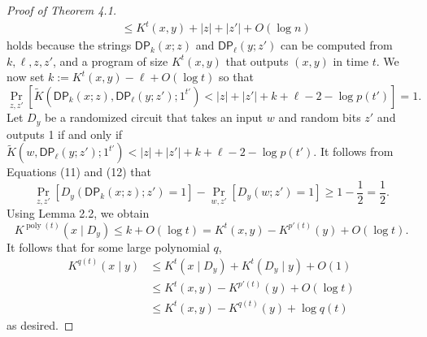 \documentclass[10pt,a4paper]{article}
\begin{document}
\begin{proof}[Proof of Theorem 4.1]
\begin{align*}
&\leq K^t(x,y)+|z|+|z'|+O(\log n)
\end{align*}
holds because the strings $\mathsf{DP}_k(x;z)$ and $\mathsf{DP}_\ell(y;z')$ can be computed from $k,\ell,z,z'$, and a program of size $K^t(x,y)$ that outputs $(x,y)$ in time $t$. We now set $k:=K^t(x,y)-\ell+O(\log t)$ so that
\[\Pr_{z,z'}[\widetilde K(\mathsf{DP}_k(x;z),\mathsf{DP}_\ell(y;z');1^{t'})<|z|+|z'|+k+\ell-2-\log p(t')]=1.\tag{12}\]
Let $D_y$ be a randomized circuit that takes an input $w$ and random bits $z'$ and outputs 1 if and only if $\widetilde K(w,\mathsf{DP}_\ell(y;z');1^{t'})<|z|+|z'|+k+\ell-2-\log p(t')$. It follows from Equations (11) and (12) that
\[\Pr_{z,z'}[D_y(\mathsf{DP}_k(x;z);z')=1]-\Pr_{w,z'}[D_y(w;z')=1]\geq1-\frac12=\frac12.\]
Using Lemma 2.2, we obtain
\[K^{\operatorname{poly}(t)}(x\mid D_y)\leq k+O(\log t)=K^t(x,y)-K^{p'(t)}(y)+O(\log t).\]
It follows that for some large polynomial $q$,
\begin{align*}
K^{q(t)}(x\mid y)&\leq K^t(x\mid D_y)+K^t(D_y\mid y)+O(1)\\
&\leq K^t(x,y)-K^{p'(t)}(y)+O(\log t)\\
&\leq K^t(x,y)-K^{q(t)}(y)+\log q(t)
\end{align*}
as desired.
\end{proof}
\end{document}
